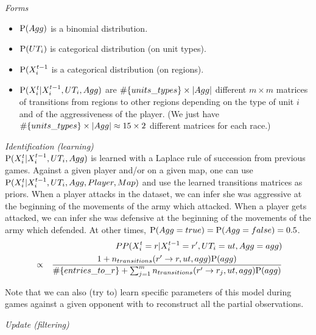 \vspace{0.3cm}
\textit{Forms}\\

\begin{itemize}
    \item $\mathrm{P}(Agg)$ is a binomial distribution.
    \item $\mathrm{P}(UT_i)$ is categorical distribution (on unit types).
    \item $\mathrm{P}(X^{t-1}_{i}$ is a categorical distribution (on regions).
    \item $\mathrm{P}(X^t_i|X^{t-1}_i,UT_i,Agg)$ are $\#\{units\_types\} \times \left\lvert Agg\right\rvert$ different $m\times m$ matrices of transitions from regions to other regions depending on the type of unit $i$ and of the aggressiveness of the player. (We just have $\#\{units\_types\} \times \left\lvert Agg\right\rvert \approx 15\times 2$ different matrices for each race.)
\end{itemize}


\vspace{0.3cm}
\textit{Identification (learning)}\\

$\mathrm{P}(X^t_i|X^{t-1}_i, UT_i, Agg)$ is learned with a Laplace rule of succession from previous games. Against a given player and/or on a given map, one can use $\mathrm{P}(X^t_i|X^{t-1}_i, UT_i, Agg, Player, Map)$ and use the learned transitions matrices as priors. When a player attacks in the dataset, we can infer she was aggressive at the beginning of the movements of the army which attacked. When a player gets attacked, we can infer she was defensive at the beginning of the movements of the army which defended. At other times, $\mathrm{P}(Agg=true) = \mathrm{P}(Agg=false) = 0.5$.
\begin{eqnarray*}
& & PP(X^t_i=r|X^{t-1}_i=r', UT_i=ut, Agg=agg) \\
& \propto & \frac{1+n_{transitions}(r'\rightarrow r, ut, agg)\mathrm{P}(agg)}{\#\{entries\_to\_r\} + \sum_{j=1}^{m} n_{transitions}(r' \rightarrow r_j, ut, agg)\mathrm{P}(agg)}
\end{eqnarray*}

Note that we can also (try to) learn specific parameters of this model during games against a given opponent with  to reconstruct all the partial observations.

\vspace{0.3cm}
\textit{Update (filtering)}\\

